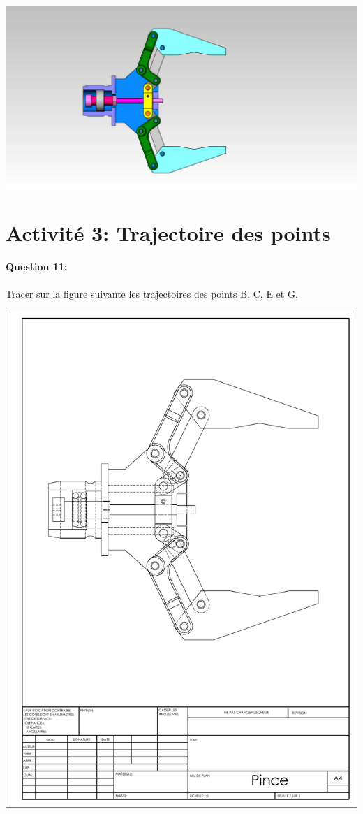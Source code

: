 \vspace{2cm}

\includegraphics[width=0.9\linewidth]{img/pince_ouverte}

\section{Activité 3: Trajectoire des points}

\paragraph{Question 11:} Tracer sur la figure suivante les trajectoires des points B, C, E et G.

\vspace{1cm}

\includegraphics[width=0.9\linewidth]{img/Pince}

